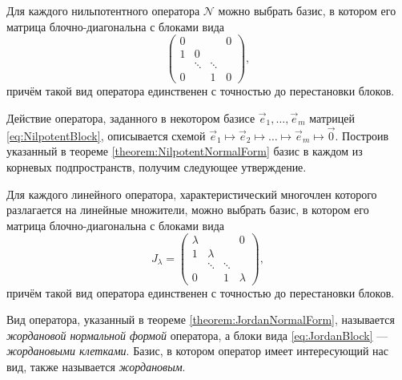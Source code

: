\begin{theorem} \label{theorem:NilpotentNormalForm}
	Для каждого нильпотентного оператора $\mathcal{N}$ можно выбрать базис, в котором его матрица блочно-диагональна с блоками вида
	\begin{equation} \label{eq:NilpotentBlock}
		\begin{pmatrix}
			0 & & & 0 \\
			1 & 0 & & \\
			 & \ddots & \ddots & \\
			0 & & 1 & 0
		\end{pmatrix},
	\end{equation}
	причём такой вид оператора единственен с точностью до перестановки блоков.
\end{theorem}

Действие оператора, заданного в некотором базисе $\vec{e}_1, \ldots, \vec{e}_m$ матрицей \eqref{eq:NilpotentBlock}, описывается схемой\footnotemark{} $\vec{e}_1 \mapsto \vec{e}_2 \mapsto \ldots \mapsto \vec{e}_m \mapsto \vec{0}$. Построив указанный в теореме \ref{theorem:NilpotentNormalForm} базис в каждом из корневых подпространств, получим следующее утверждение.


\begin{theorem} \label{theorem:JordanNormalForm}
	Для каждого линейного оператора, характеристический многочлен которого разлагается на линейные множители, можно выбрать базис, в котором его матрица блочно-диагональна с блоками вида
	\begin{equation} \label{eq:JordanBlock}
		J_\lambda =
		\begin{pmatrix}
			\lambda & & & 0 \\
			1 & \lambda & & \\
			 & \ddots & \ddots & \\
			0 & & 1 & \lambda
		\end{pmatrix},
	\end{equation}
	причём такой вид оператора единственен с точностью до перестановки блоков.
\end{theorem}

\begin{definition}
	Вид оператора, указанный в теореме \ref{theorem:JordanNormalForm}, называется \textit{жордановой нормальной формой} оператора, а блоки вида \eqref{eq:JordanBlock} --- \textit{жордановыми клетками}. Базис, в котором оператор имеет интересующий нас вид, также называется \textit{жордановым}.
\end{definition}


